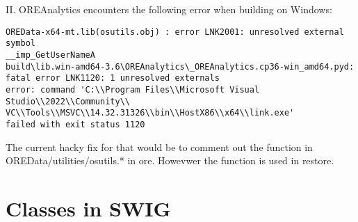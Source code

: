\documentclass[10pt]{article}
\begin{document}
II. OREAnalytics encounters the following error when building on Windows:
\begin{lstlisting}[basicstyle=\small]
OREData-x64-mt.lib(osutils.obj) : error LNK2001: unresolved external symbol
__imp_GetUserNameA
build\lib.win-amd64-3.6\OREAnalytics\_OREAnalytics.cp36-win_amd64.pyd:
fatal error LNK1120: 1 unresolved externals
error: command 'C:\\Program Files\\Microsoft Visual Studio\\2022\\Community\\
VC\\Tools\\MSVC\\14.32.31326\\bin\\HostX86\\x64\\link.exe'
failed with exit status 1120
\end{lstlisting}
The current hacky fix for that would be to comment out the function in OREData/utilities/osutils.* in ore. Howevwer the function is used in restore.



\pagebreak
\section*{Classes in SWIG}
\end{document}
